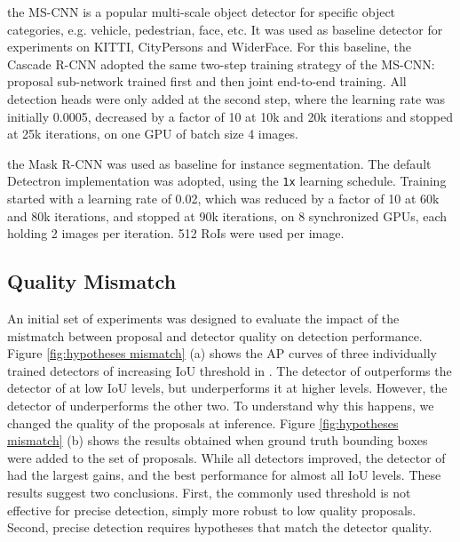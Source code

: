 \documentclass[10pt,journal,compsoc]{IEEEtran}
\begin{document}
\vspace{0.2cm}
the MS-CNN \cite{DBLP:conf/eccv/CaiFFV16} is a popular multi-scale object
detector for specific object categories, e.g. vehicle, pedestrian, face, etc.
It was used as baseline detector for experiments on KITTI, CityPersons and WiderFace.
For this baseline, the Cascade R-CNN adopted the same two-step training
strategy of the MS-CNN: proposal sub-network trained
first and then joint end-to-end training. All detection heads were only added at
the second step, where the learning rate was initially 0.0005,
decreased by a factor of 10 at 10k and 20k iterations and stopped at
25k iterations, on one GPU of batch size 4 images.

\vspace{0.2cm}
the Mask R-CNN was used as baseline for instance segmentation. The default
Detectron implementation was adopted, using the \texttt{1x} learning schedule.
Training started with a learning rate of 0.02, which was reduced by a factor
of 10 at 60k and 80k iterations, and stopped at 90k iterations, on 8
synchronized GPUs, each holding 2 images per iteration. 512 RoIs were
used per image.


\subsection{Quality Mismatch}

An initial set of experiments was designed to evaluate the impact of
the mistmatch between proposal and detector quality on detection
performance. Figure \ref{fig:hypotheses mismatch} (a) shows the AP
curves of three
individually trained detectors of increasing IoU threshold in
. The detector of  outperforms the detector
of  at low IoU levels, but underperforms it at higher levels.
However, the detector of  underperforms the other two.
To understand why this happens, we changed the quality of the proposals
at inference. Figure \ref{fig:hypotheses mismatch} (b)
shows the results obtained when ground truth bounding boxes were added to
the set of proposals. While all detectors improved, the detector of 
had the largest gains, and the best performance for almost all
IoU levels. These results suggest two conclusions. First, the
commonly used  threshold is not effective
for precise detection, simply more robust to low quality
proposals. Second, precise detection requires hypotheses that match
the detector quality.
\end{document}
